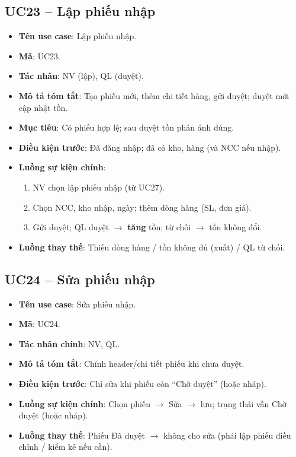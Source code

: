\subsection{UC23 -- Lập phiếu nhập}

\begin{itemize}[leftmargin=1.5cm]
    \item \textbf{Tên use case}: Lập phiếu nhập.
    \item \textbf{Mã}: UC23.
    \item \textbf{Tác nhân}: NV (lập), QL (duyệt).
    \item \textbf{Mô tả tóm tắt}: Tạo phiếu mới, thêm chi tiết hàng, gửi duyệt; duyệt mới cập nhật tồn.
    \item \textbf{Mục tiêu}: Có phiếu hợp lệ; sau duyệt tồn phản ánh đúng.
    \item \textbf{Điều kiện trước}: Đã đăng nhập; đã có kho, hàng (và NCC nếu nhập).
    \item \textbf{Luồng sự kiện chính}:
    \begin{enumerate}
        \item NV chọn lập phiếu nhập (từ UC27).
        
        \item Chọn NCC, kho nhập, ngày; thêm dòng hàng (SL, đơn giá).
        \item Gửi duyệt; QL duyệt $\rightarrow$ \textbf{tăng} tồn; từ chối $\rightarrow$ tồn không đổi.
    \end{enumerate}
    \item \textbf{Luồng thay thế}: Thiếu dòng hàng / tồn không đủ (xuất) / QL từ chối.
\end{itemize}

\subsection{UC24 -- Sửa phiếu nhập}

\begin{itemize}[leftmargin=1.5cm]
    \item \textbf{Tên use case}: Sửa phiếu nhập.
    \item \textbf{Mã}: UC24.
    \item \textbf{Tác nhân chính}: NV, QL.
    \item \textbf{Mô tả tóm tắt}: Chỉnh header/chi tiết phiếu khi chưa duyệt.
    \item \textbf{Điều kiện trước}: Chỉ sửa khi phiếu còn ``Chờ duyệt'' (hoặc nháp).
    \item \textbf{Luồng sự kiện chính}: Chọn phiếu $\rightarrow$ Sửa $\rightarrow$ lưu; trạng thái vẫn Chờ duyệt (hoặc nháp).
    \item \textbf{Luồng thay thế}: Phiếu Đã duyệt $\rightarrow$ không cho sửa (phải lập phiếu điều chỉnh / kiểm kê nếu cần).
\end{itemize}

